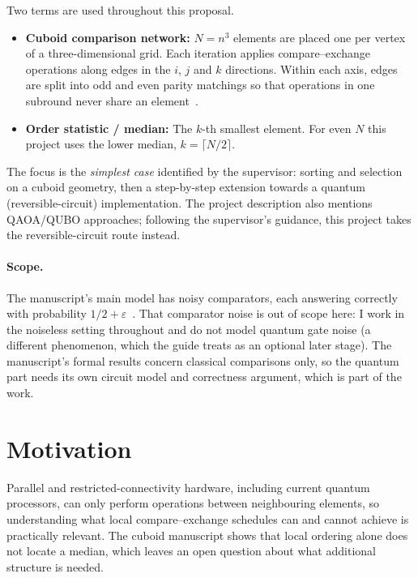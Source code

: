 \documentclass[11pt,a4paper]{article}
\begin{document}
Two terms are used throughout this proposal.
\begin{itemize}
  \item \textbf{Cuboid comparison network:} $N=n^3$ elements are placed one per vertex of a three-dimensional grid. Each iteration applies compare--exchange operations along edges in the $i$, $j$ and $k$ directions. Within each axis, edges are split into odd and even parity matchings so that operations in one subround never share an element~\cite{jiang}.
  \item \textbf{Order statistic / median:} The $k$-th smallest element. For even $N$ this project uses the lower median, $k=\lceil N/2\rceil$.
\end{itemize}

The focus is the \emph{simplest case} identified by the supervisor: sorting and selection on a cuboid geometry, then a step-by-step extension towards a quantum (reversible-circuit) implementation. The project description also mentions QAOA/QUBO approaches; following the supervisor's guidance, this project takes the reversible-circuit route instead.

\paragraph{Scope.} The manuscript's main model has noisy comparators, each answering correctly with probability $1/2+\varepsilon$~\cite{jiang}. That comparator noise is out of scope here: I work in the noiseless setting throughout and do not model quantum gate noise (a different phenomenon, which the guide treats as an optional later stage). The manuscript's formal results concern classical comparisons only, so the quantum part needs its own circuit model and correctness argument, which is part of the work.

\section{Motivation}

Parallel and restricted-connectivity hardware, including current quantum processors, can only perform operations between neighbouring elements, so understanding what local compare--exchange schedules can and cannot achieve is practically relevant. The cuboid manuscript shows that local ordering alone does not locate a median, which leaves an open question about what additional structure is needed.
\end{document}
